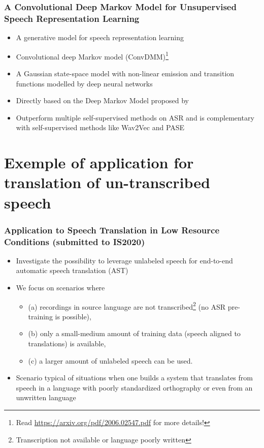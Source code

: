 \documentclass[table]{beamer}
\begin{document}
\begin{frame}
\frametitle{A Convolutional Deep Markov Model for Unsupervised Speech Representation Learning}

		\begin{itemize}
			\item A generative model for speech representation learning  \citep{khurana2020convolutional}
			\item Convolutional deep Markov model (ConvDMM)\footnote{Read \url{https://arxiv.org/pdf/2006.02547.pdf} for more details!}
			\item A Gaussian state-space model with non-linear emission and transition functions modelled by deep neural networks
			\item Directly based on the Deep Markov Model proposed by \citep{krishnan2016structured}
			\item Outperform multiple self-supervised methods on ASR and is complementary with self-supervised methods like Wav2Vec and PASE
		\end{itemize}

\end{frame}



\section{Exemple of application for translation of un-transcribed  speech}

\begin{frame}
\frametitle{Application to Speech Translation in Low Resource Conditions (submitted to IS2020)}

		\begin{itemize}
			\item Investigate the possibility to leverage unlabeled speech for end-to-end automatic speech translation (AST)
			\item We focus on scenarios where 
				\begin{itemize}
					\item (a) recordings in source language are not transcribed\footnote{Transcription not available or language poorly written} (no ASR pre-training is possible), 
					\item (b) only a small-medium amount of training data (speech aligned to translations) is available, 
					\item (c) a larger amount of unlabeled speech can be used. 			
				\end{itemize}
			\item Scenario typical of situations when one builds a system that translates from speech in a language with poorly standardized orthography or even from an unwritten language
		\end{itemize}

\end{frame}
\end{document}
